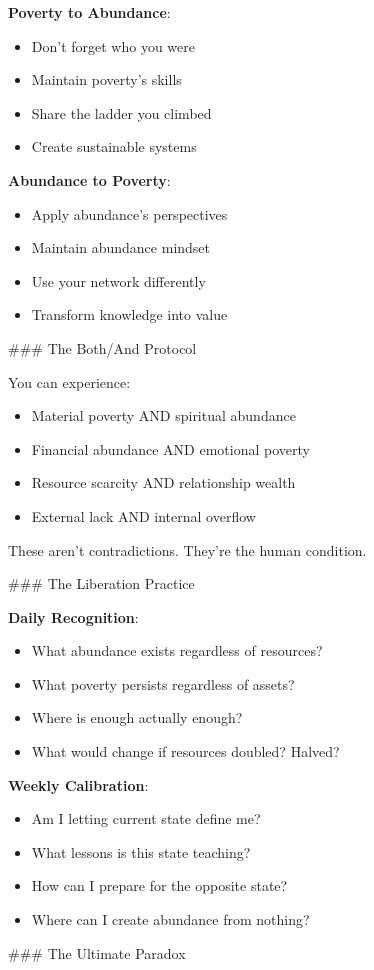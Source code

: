 \documentclass[12pt]{book}
\begin{document}
\textbf{Poverty to Abundance}:
\begin{itemize}
\item Don't forget who you were
\item Maintain poverty's skills
\item Share the ladder you climbed
\item Create sustainable systems

\end{itemize}
\textbf{Abundance to Poverty}:
\begin{itemize}
\item Apply abundance's perspectives
\item Maintain abundance mindset
\item Use your network differently
\item Transform knowledge into value

\end{itemize}
\#\#\# The Both/And Protocol

You can experience:
\begin{itemize}
\item Material poverty AND spiritual abundance
\item Financial abundance AND emotional poverty
\item Resource scarcity AND relationship wealth
\item External lack AND internal overflow

\end{itemize}
These aren't contradictions. They're the human condition.

\#\#\# The Liberation Practice

\textbf{Daily Recognition}:
\begin{itemize}
\item What abundance exists regardless of resources?
\item What poverty persists regardless of assets?
\item Where is enough actually enough?
\item What would change if resources doubled? Halved?

\end{itemize}
\textbf{Weekly Calibration}:
\begin{itemize}
\item Am I letting current state define me?
\item What lessons is this state teaching?
\item How can I prepare for the opposite state?
\item Where can I create abundance from nothing?

\end{itemize}
\#\#\# The Ultimate Paradox
\end{document}
